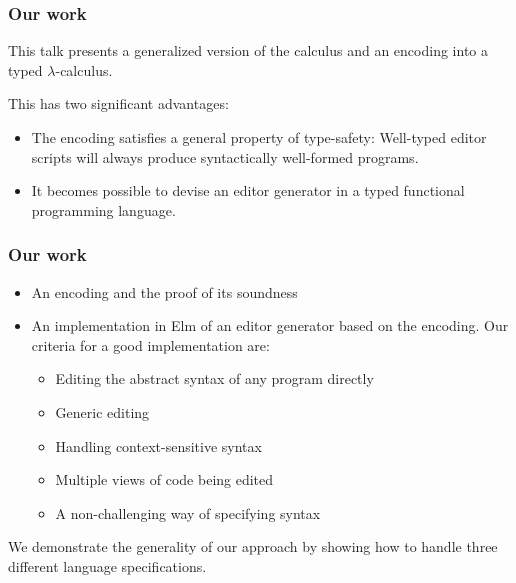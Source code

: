 \documentclass[t,24pt,aspectratio=169]{beamer}
\begin{document}
\begin{frame}[hvid]
    \frametitle{Our work}

    This talk presents a generalized version of the calculus and an
    encoding into a typed $\lambda$-calculus.

        \bigskip

    This has two significant advantages:
    
    \begin{itemize}
\item The encoding satisfies \alert{a general property of type-safety}:
    Well-typed editor scripts will always produce syntactically
    well-formed programs.
    
  \item It becomes possible to devise an editor generator in a typed
    functional programming language.
    \end{itemize}
    
\end{frame}

\begin{frame}
  \frametitle{Our work}

  \begin{itemize}
  \item An encoding and the proof of its soundness
    
  \item An implementation in Elm of an editor generator based on the
    encoding. Our criteria for a good implementation are:
              \begin{itemize}
                  \pause
                  \item Editing the abstract syntax of any program directly
                        \pause
                  \item Generic editing
                        \pause
                  \item Handling context-sensitive syntax
                        \pause
                  \item Multiple views of code being edited
                        \pause
                  \item A non-challenging way of specifying syntax
              \end{itemize}
            \end{itemize}

            We demonstrate the generality of our approach by showing
            how to handle three different language specifications.
\end{frame}
\end{document}
